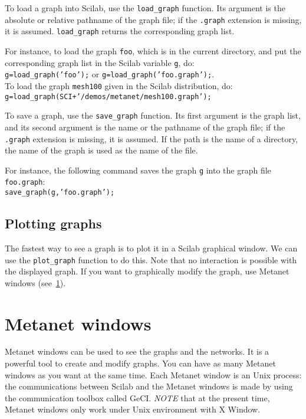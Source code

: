 \documentclass[11pt]{article}
\newcommand{\func}[1]{\texttt{#1}}
\begin{document}
To load a graph into Scilab, use the \func{load\_graph} function.
Its argument is the absolute or relative pathname of the
graph file; if the \texttt{.graph} extension is missing, it is
assumed. \func{load\_graph} returns the corresponding graph list.

For instance, to load the graph \texttt{foo}, which is in the current
directory, and put the corresponding graph list in the Scilab variable
\texttt{g}, do:\\
\texttt{g=load\_graph('foo');} or \texttt{g=load\_graph('foo.graph');}.\\
To load the graph \texttt{mesh100} given in the Scilab distribution,
do:\\
\texttt{g=load\_graph(SCI+'/demos/metanet/mesh100.graph');}

\medskip

To save a graph, use the \func{save\_graph} function. Its first
argument is the graph list, and its second argument is the name or the
pathname of the graph file; if the \texttt{.graph} extension is missing, it is 
assumed. If the path  is the name of a directory, the name of the graph is
used as the name of the file.

For instance, the following command saves the graph \texttt{g} into
the graph file \texttt{foo.graph}:\\
\texttt{save\_graph(g,'foo.graph');}

\subsection{Plotting graphs}\label{plotting}

The fastest way to see a graph is to plot it in a Scilab graphical
window. We can use the \func{plot\_graph} function to do this.
Note that no interaction is possible with the displayed graph. If you
want to graphically modify the graph, use Metanet windows
(see~\ref{xmetanet}).

\section{Metanet windows}\label{xmetanet}

Metanet windows can be used to see the graphs and the
networks. It is a powerful tool to create and modify
graphs. You can have as many Metanet windows as you want
at the same time. Each Metanet window is an Unix process: the
communications between Scilab and the Metanet windows is made by using
the communication toolbox called GeCI. \emph{NOTE} that at the
present time, Metanet windows only work under Unix environment with
X Window.
\end{document}
